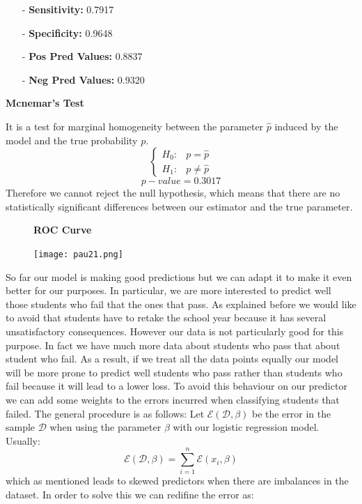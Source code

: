 \documentclass[a4paper, 11pt]{article}
\theoremstyle{definition}
\numberwithin{equation}{section}		%
\numberwithin{table}{section}				%
\begin{document}
\begin{itemize}

    \item[-] \textbf{Sensitivity: } 0.7917
    \item[-] \textbf{Specificity: } 0.9648
    \item[-] \textbf{Pos Pred Values: } 0.8837
    \item[-] \textbf{Neg Pred Values: } 0.9320
\end{itemize}
\begin{center}
    \textbf{Mcnemar's Test}
\end{center}
It is a test for marginal homogeneity between the parameter $\hat{p}$ induced by the model and the true probability $p$.
\begin{equation*}
    \begin{cases}
      H_0:  & p = \hat{p} \\
      H_1:  & p  \neq \hat{p}
    \end{cases}
  \end{equation*}
  \bigskip
$$\boxed{p-value = 0.3017}$$
Therefore we cannot reject the null hypothesis, which means that there are no statistically significant differences between our estimator and the true parameter.
\begin{figure}[h]\centering
\textbf{ROC Curve}\par\medskip
\texttt{[image: pau21.png]}
\end{figure}
\newpage
So far our model is making good predictions but we can adapt it to make it even better for our purposes. In particular, we are more interested to predict well those students who fail that the ones that pass. As explained before we would like to avoid that students have to retake the school year because it has several unsatisfactory consequences. However our data is not particularly good for this purpose. In fact we have much more data about students who pass that about student who fail. As a result, if we treat all the data points equally our model will be more prone to predict well students who pass rather than students who fail because it will lead to a lower loss. To avoid this behaviour on our predictor we can add some weights to the errors incurred when classifying students that failed. The general procedure is as follows:
Let $\mathcal{E}(\mathcal{D}, \beta)$ be the error in the sample $\mathcal{D}$ when using the parameter $\beta$ with our logistic regression model. Usually: $$\mathcal{E}(\mathcal{D}, \beta) = \sum_{i=1}^n\mathcal{E}(x_i, \beta)$$
which as mentioned leads to skewed predictors when there are imbalances in the dataset. In order to solve this we can redifine the error as:
\end{document}
